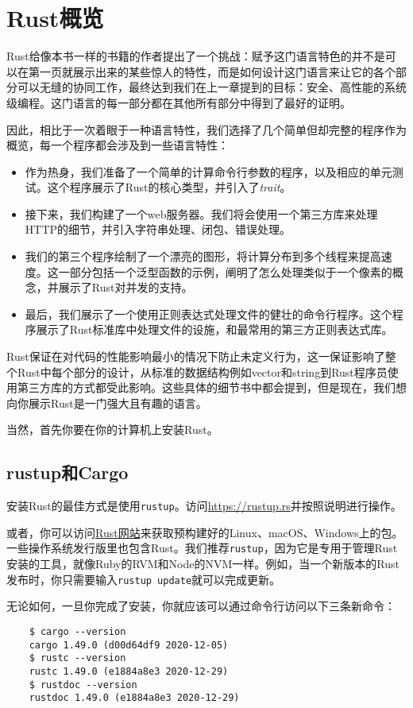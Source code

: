 \chapter{Rust概览}\label{ch02}
Rust给像本书一样的书籍的作者提出了一个挑战：赋予这门语言特色的并不是可以在第一页就展示出来的某些惊人的特性，而是如何设计这门语言来让它的各个部分可以无缝的协同工作，最终达到我们在上一章提到的目标：安全、高性能的系统级编程。这门语言的每一部分都在其他所有部分中得到了最好的证明。

因此，相比于一次着眼于一种语言特性，我们选择了几个简单但却完整的程序作为概览，每一个程序都会涉及到一些语言特性：

\begin{itemize}
    \item 作为热身，我们准备了一个简单的计算命令行参数的程序，以及相应的单元测试。这个程序展示了Rust的核心类型，并引入了\emph{trait}。
    \item 接下来，我们构建了一个web服务器。我们将会使用一个第三方库来处理HTTP的细节，并引入字符串处理、闭包、错误处理。
    \item 我们的第三个程序绘制了一个漂亮的图形，将计算分布到多个线程来提高速度。这一部分包括一个泛型函数的示例，阐明了怎么处理类似于一个像素的概念，并展示了Rust对并发的支持。
    \item 最后，我们展示了一个使用正则表达式处理文件的健壮的命令行程序。这个程序展示了Rust标准库中处理文件的设施，和最常用的第三方正则表达式库。
\end{itemize}

Rust保证在对代码的性能影响最小的情况下防止未定义行为，这一保证影响了整个Rust中每个部分的设计，从标准的数据结构例如vector和string到Rust程序员使用第三方库的方式都受此影响。这些具体的细节书中都会提到，但是现在，我们想向你展示Rust是一门强大且有趣的语言。

当然，首先你要在你的计算机上安装Rust。

\section{rustup和Cargo}
安装Rust的最佳方式是使用\texttt{rustup}。访问\url{https://rustup.rs}并按照说明进行操作。

或者，你可以访问\href{https://www.rust-lang.org/}{Rust网站}来获取预构建好的Linux、macOS、Windows上的包。一些操作系统发行版里也包含Rust。我们推荐\texttt{rustup}，因为它是专用于管理Rust安装的工具，就像Ruby的RVM和Node的NVM一样。例如，当一个新版本的Rust发布时，你只需要输入\texttt{rustup update}就可以完成更新。

无论如何，一旦你完成了安装，你就应该可以通过命令行访问以下三条新命令：
\begin{verbatim}
    $ cargo --version
    cargo 1.49.0 (d00d64df9 2020-12-05)
    $ rustc --version
    rustc 1.49.0 (e1884a8e3 2020-12-29)
    $ rustdoc --version
    rustdoc 1.49.0 (e1884a8e3 2020-12-29)
\end{verbatim}

